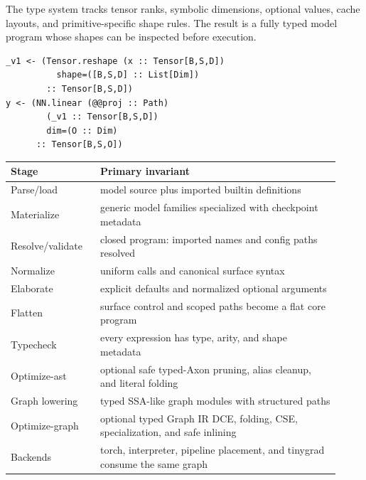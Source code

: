 \documentclass{article}
\newcommand{\postertext}[1]{{\raggedright\fontsize{23}{29}\selectfont #1\par}}
\begin{document}
\hfill
\begin{minipage}[t]{0.49\linewidth}
\begin{tcolorbox}[posterbox,title={Typed Core}]
\postertext{The type system tracks tensor ranks, symbolic dimensions, optional
values, cache layouts, and primitive-specific shape rules. The result is a
fully typed model program whose shapes can be inspected before execution.}
\begin{tcolorbox}[codebox]
\begin{lstlisting}[basicstyle=\ttfamily\fontsize{18}{20}\selectfont]
_v1 <- (Tensor.reshape (x :: Tensor[B,S,D])
          shape=([B,S,D] :: List[Dim])
        :: Tensor[B,S,D])
y <- (NN.linear (@@proj :: Path)
        (_v1 :: Tensor[B,S,D])
        dim=(O :: Dim)
      :: Tensor[B,S,O])
\end{lstlisting}
\end{tcolorbox}
\end{tcolorbox}

\vspace{7mm}

\begin{tcolorbox}[posterbox,title={Stage Contracts}]
{\fontsize{21}{27}\selectfont
\begin{tabular}{@{}p{0.25\linewidth}p{0.67\linewidth}@{}}
\toprule
Stage & Primary invariant \\
\midrule
Parse/load & model source plus imported builtin definitions \\
Materialize & generic model families specialized with checkpoint metadata \\
Resolve/validate & closed program: imported names and config paths resolved \\
Normalize & uniform calls and canonical surface syntax \\
Elaborate & explicit defaults and normalized optional arguments \\
Flatten & surface control and scoped paths become a flat core program \\
Typecheck & every expression has type, arity, and shape metadata \\
Optimize-ast & optional safe typed-Axon pruning, alias cleanup, and literal folding \\
Graph lowering & typed SSA-like graph modules with structured paths \\
Optimize-graph & optional typed Graph IR DCE, folding, CSE, specialization, and safe inlining \\
Backends & torch, interpreter, pipeline placement, and tinygrad consume the same graph \\
\bottomrule
\end{tabular}
}
\end{tcolorbox}
\end{minipage}
\end{document}
